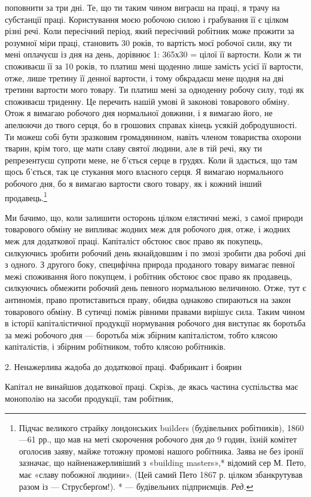 поповнити за три дні. Те, що ти таким чином виграєш на праці,
я трачу на субстанції праці. Користування моєю робочою силою
і грабування її є цілком різні речі. Коли пересічний період,
який пересічний робітник може прожити за розумної міри праці,
становить 30 років, то вартість моєї робочої сили, яку ти мені
оплачуєш із дня на день, дорівнює 1: 365х30 =   цілої її
вартости. Коли ж ти споживаєш її за 10 років, то платиш мені
щоденно лише  замість  усієї її вартости, отже, лише
третину її денної вартости, і тому обкрадаєш мене щодня на дві
третини вартости мого товару. Ти платиш мені за одноденну
робочу силу, тоді як споживаєш триденну. Це перечить нашій
умові й законові товарового обміну. Отож я вимагаю робочого
дня нормальної довжини, і я вимагаю його, не апелюючи до твого
серця, бо в грошових справах кінець усякій добродушності.
Ти можеш собі бути зразковим громадянином, навіть членом
товариства охорони тварин, крім того, ще мати славу святої
людини, але в тій речі, яку ти репрезентуєш супроти мене, не
б’ється серце в грудях. Коли й здається, що там щось б’ється,
так це стукання мого власного серця. Я вимагаю нормального
робочого дня, бо я вимагаю вартости свого товару, як і кожний
інший продавець.\footnote{
Підчас великого страйку лондонських builders (будівельних робітників),
1860—61 рр., що мав на меті скорочення робочого дня до 9 годин,
їхній комітет оголосив заяву, майже тотожну промові нашого робітника.
Заява не без іронії зазначає, що найненажерливіший з «building
masters»,* відомий сер М. Пето, має «славу побожної людини». (Цей
самий Пето 1867 р. цілком збанкрутував разом із — Струсберґом!).
* — будівельних підприємців. \emph{Ред.}
}

Ми бачимо, що, коли залишити осторонь цілком елястичні
межі, з самої природи товарового обміну не випливає жодних
меж для робочого дня, отже, і жодних меж для додаткової праці.
Капіталіст обстоює своє право як покупець, силкуючись зробити
робочий день якнайдовшим і по змозі зробити два робочі дні з
одного. З другого боку, специфічна природа проданого товару
вимагає певної межі споживання його покупцем, і робітник обстоює
своє право як продавець, силкуючись обмежити робочий день
певного нормальною величиною. Отже, тут є антиномія, право
протиставиться праву, обидва однаково спираються на закон
товарового обміну. В сутичці поміж рівними правами вирішує
сила. Таким чином в історії капіталістичної продукції нормування
робочого дня виступає як боротьба за межі робочого дня —
боротьба між збірним капіталістом, тобто клясою капіталістів,
і збірним робітником, тобто клясою робітників.

2. Ненажерлива жадоба до додаткової праці. Фабрикант і боярин

Капітал не винайшов додаткової праці. Скрізь, де якась частина
суспільства має монополію на засоби продукції, там робітник,